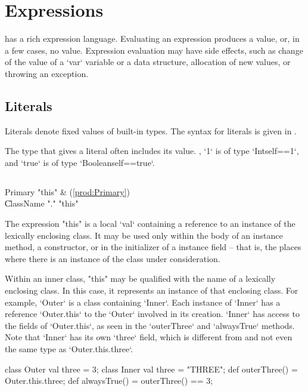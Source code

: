 \chapter{Expressions}\label{XtenExpressions}

\Xten{} has a rich expression language.
Evaluating an expression produces a value, or, in a few cases, no value. 
Expression evaluation may have side effects, such as change of the value of a 
\xcd`var` variable or a data structure, allocation of new values, or throwing
an exception. 


\section{Literals}

Literals denote fixed values of built-in types. 
The syntax for literals is given in . 

The type that \Xten{} gives a literal often includes its value. \Eg, \xcd`1`
is of type \xcd`Int{self==1}`, and \xcd`true` is of type
\xcd`Boolean{self==true}`.

\section{}

\begin{bbgrammar}
 Primary    \:      \xcd"this" & (\ref{prod:Primary})\\%
    \| ClassName \xcd"." \xcd"this"\\
\end{bbgrammar}

The expression \xcd"this" is a  local \xcd`val` containing a reference
to an instance of the lexically enclosing class.
It may be used only within the body of an instance method, a
constructor, or in the initializer of a instance field -- that is, the places
where there is an instance of the class under consideration.

Within an inner class, \xcd"this" may be qualified with the
name of a lexically enclosing class.  In this case, it
represents an instance of that enclosing class.  
For example, \xcd`Outer` is a class containing \xcd`Inner`.  Each instance of
\xcd`Inner` has a reference \xcd`Outer.this` to the \xcd`Outer` involved in its
creation.  \xcd`Inner` has access to the fields of \xcd`Outer.this`, as seen
in the \xcd`outerThree` and \xcd`alwaysTrue` methods.  Note that \xcd`Inner`
has its own \xcd`three` field, which is different from and not even the same
type as \xcd`Outer.this.three`. 
\begin{xten}
class Outer {
  val three = 3;
  class Inner {
     val three = "THREE";
     def outerThree() = Outer.this.three;
     def alwaysTrue() = outerThree() == 3;
  }
}
\end{xten}
%


